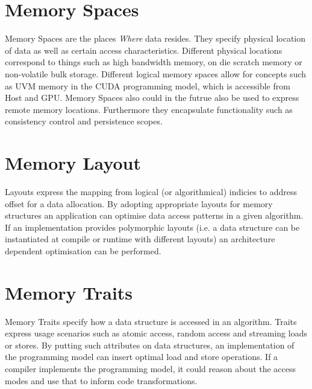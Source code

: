 \section{Memory Spaces}

Memory Spaces are the places {\it Where} data resides.
They specify physical location of data as well as certain access characteristics. 
Different physical locations correspond to things such as high bandwidth memory, on die scratch memory or non-volatile bulk storage.
Different logical memory spaces allow for concepts such as UVM memory in the CUDA programming model, which is accessible from Host and GPU. 
Memory Spaces also could in the futrue also be used to express remote memory locations.
Furthermore they encapsulate functionality such as consistency control and persistence scopes.

\section{Memory Layout}

Layouts express the mapping from logical (or algorithmical) indicies to address offset for a data allocation. 
By adopting appropriate layouts for memory structures an application can optimise data access patterns in a given algorithm.
If an implementation provides polymorphic layouts (i.e. a data structure can be instantiated at compile or runtime with different layouts) an architecture dependent optimisation can be performed.

\section{Memory Traits}

Memory Traits specify how a data structure is accessed in an algorithm. 
Traits express usage scenarios such as atomic access, random access and streaming loads or stores.
By putting such attributes on data structures, an implementation of the programming model can insert optimal load and store operations.
If a compiler implements the programming model, it could reason about the access modes and use that to inform code transformations.   

